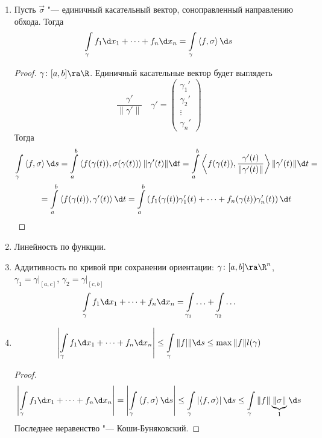 \begin{enumerate}
\item
	Пусть $\vec\sigma$ "--- единичный касательный вектор, соноправленный направлению обхода.
	Тогда
	\[ \int\limits_\gamma f_1 \d x_1 + \dots + f_n \d x_n = \int\limits_\gamma \left<f, \sigma\right> \d s \]
	\begin{proof}
		$\gamma\colon[a, b] \ra \R$.
		Единичный касательные вектор будет выглядеть
		\[ \frac{\gamma'}{\|\gamma'\|} \quad \gamma' = \begin{pmatrix} \gamma_1' \\ \gamma_2' \\ \vdots \\ \gamma_n' \end{pmatrix} \]
		Тогда
		\begin{gather*}
			\int\limits_\gamma \left<f, \sigma\right> \d s
			= \int\limits_a^b \left<f(\gamma(t)), \sigma(\gamma(t))\right> \|\gamma'(t)\| \d t
			= \int\limits_a^b \left<f(\gamma(t)), \frac{\gamma'(t)}{\|\gamma'(t)\|}\right> \|\gamma'(t)\| \d t = \\
			= \int\limits_a^b \left<f(\gamma(t)), \gamma'(t)\right> \d t
			= \int\limits_a^b \left(f_1(\gamma(t))\gamma'_1(t) + \dots + f_n(\gamma(t))\gamma'_n(t) \right) \d t
		\end{gather*}
	\end{proof}

\item
	Линейность по функции.

\item
	Аддитивность по кривой при сохранении ориентации: $\gamma\colon[a, b] \ra \R^n$, $\gamma_1 = \gamma\bigr|_{[a,c]}$, $\gamma_2 = \gamma\bigr|_{[c, b]}$
	\[ \int\limits_\gamma f_1 \d x_1 + \dots + f_n \d x_n = \int\limits_{\gamma_1} \ldots + \int\limits_{\gamma_2} \ldots \]

\item
	\[ \left| \int\limits_\gamma f_1 \d x_1 + \dots + f_n \d x_n \right| \le \int\limits_\gamma \|f|\| \d s \le \max \|f\| l(\gamma) \]
	\begin{proof}
		\begin{gather*}
			\left| \int\limits_\gamma f_1 \d x_1 + \dots + f_n \d x_n \right|
			= \left| \int\limits_\gamma \left<f, \sigma\right> \d s \right|
			\le \int\limits_\gamma \left|\left<f, \sigma\right>\right| \d s
			\le \int\limits_\gamma \|f\| \underbrace{\|\sigma\|}_1 \d s
		\end{gather*}
		Последнее неравенство "--- Коши-Буняковский.
	\end{proof}


\end{enumerate}
